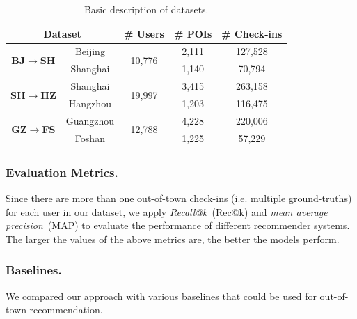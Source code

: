 \documentclass[letterpaper]{article} %
\newcommand{\bjsh}{{\bf BJ\ensuremath{\rightarrow}SH}}
\newcommand{\shhz}{{\bf SH\ensuremath{\rightarrow}HZ}}
\newcommand{\gzfs}{{\bf GZ\ensuremath{\rightarrow}FS}}
\begin{document}
\begin{table}[t] 
    \tabcolsep 0.06in
    \caption{Basic description of datasets.} \label{tab:dataset}
    \begin{center}
    \begin{tabular}{ c|c|c|c|c }
      \toprule
      \multicolumn{2}{c|}{Dataset}   & \# Users  & \# POIs   & \# Check-ins  %
      \\ \hline \hline 
      \multirow{2}{*}{\bjsh} 
        & Beijing   & \multirow{2}{*}{10,776}   & 2,111 & 127,528   %
      \\ \cline{2-2}\cline{4-5}
        & Shanghai  &                           & 1,140 & 70,794    %
      \\ \hline
        \multirow{2}{*}{\shhz} 
        & Shanghai  & \multirow{2}{*}{19,997}   & 3,415 & 263,158   %
      \\ \cline{2-2}\cline{4-5}
        & Hangzhou  &                           & 1,203 & 116,475   %
      \\ \hline
      \multirow{2}{*}{\gzfs} 
        & Guangzhou & \multirow{2}{*}{12,788}   & 4,228 & 220,006   %
      \\ \cline{2-2}\cline{4-5}
        & Foshan    &                           & 1,225 & 57,229    %
      \\ 
      \bottomrule
  \end{tabular}
  \end{center}
\end{table}


\subsubsection{Evaluation Metrics.}
Since there are more than one out-of-town check-ins (i.e. multiple ground-truths) for each user in our dataset, 
we apply \textit{Recall@k}~(Rec@k) and \textit{mean average precision}~(MAP) to evaluate the performance of different recommender systems. 
The larger the values of the above metrics are, the better the models perform.


\subsubsection{Baselines.}
We compared our approach with various baselines that could be used for out-of-town recommendation.
\end{document}
